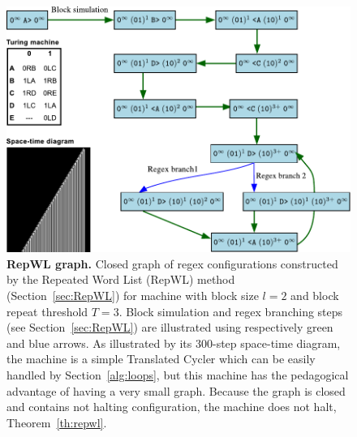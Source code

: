 
\newpage



\begin{figure}[h!]
    \centering
    \includegraphics[scale=0.8]{figures/RepWL/RepWL_graph.pdf}
    \caption{{\small \textbf{RepWL graph.} Closed graph of regex configurations constructed by the Repeated Word List (RepWL) method (Section~\ref{sec:RepWL}) for machine  with block size $l=2$ and block repeat threshold $T=3$. Block simulation and regex branching steps (see Section~\ref{sec:RepWL}) are illustrated using respectively green and blue arrows. As illustrated by its 300-step space-time diagram, the machine is a simple Translated Cycler which can be easily handled by Section~\ref{alg:loops}, but this machine has the pedagogical advantage of having a very small graph. Because the graph is closed and contains not halting configuration, the machine does not halt, Theorem~\ref{th:repwl}.}}\label{fig:repWL}
\end{figure}


